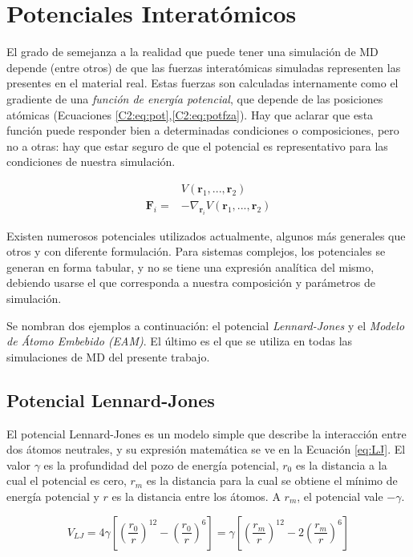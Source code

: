 \section{Potenciales Interatómicos}
\label{S2_3}

El grado de semejanza a la realidad que puede tener una simulación de MD depende (entre otros) de que las fuerzas interatómicas simuladas representen las presentes en el material real. Estas fuerzas son calculadas internamente como el gradiente de una \textit{función de energía potencial}, que depende de las posiciones atómicas (Ecuaciones \ref{C2:eq:pot},\ref{C2:eq:potfza}). Hay que aclarar que esta función puede responder bien a determinadas condiciones o composiciones, pero no a otras: hay que estar seguro de que el potencial es representativo para las condiciones de nuestra simulación.

\begin{align}
& V(\mathbf{r}_{1},...,\mathbf{r}_{2})
\label{C2:eq:pot}\\
\mathbf{F}_{i} = & -\nabla_{\mathbf{r}_{i}}V(\mathbf{r}_{1},...,\mathbf{r}_{2})
\label{C2:eq:potfza}
\end{align}

Existen numerosos potenciales utilizados actualmente, algunos más generales que otros y con diferente formulación. Para sistemas complejos, los potenciales se generan en forma tabular, y no se tiene una expresión analítica del mismo, debiendo usarse el que corresponda a nuestra composición y parámetros de simulación.

Se nombran dos ejemplos a continuación: el potencial \textit{Lennard-Jones} y el \textit{Modelo de Átomo Embebido (EAM)}. El último es el que se utiliza en todas las simulaciones de MD del presente trabajo.

\subsection{Potencial Lennard-Jones}
\label{SS2_3_1}

El potencial Lennard-Jones es un modelo simple que describe la interacción entre dos 	átomos neutrales, y su expresión matemática se ve en la Ecuación \ref{eq:LJ}. El valor $\gamma$ es la profundidad del pozo de energía potencial, $r_{0}$ es la distancia a la cual el potencial es cero, $r_{m}$ es la distancia para la cual se obtiene el mínimo de energía potencial y $r$ es la distancia entre los átomos. A $r_{m}$, el potencial vale $-\gamma$.

\begin{equation}
V_{LJ}=4\gamma \left[ \left( \frac{r_{0}}{r} \right)^{12} - \left( \frac{r_{0}}{r} \right)^{6} \right] = 
\gamma \left[ \left( \frac{r_{m}}{r} \right)^{12} -2 \left( \frac{r_{m}}{r} \right)^{6} \right]
\label{eq:LJ}
\end{equation}

